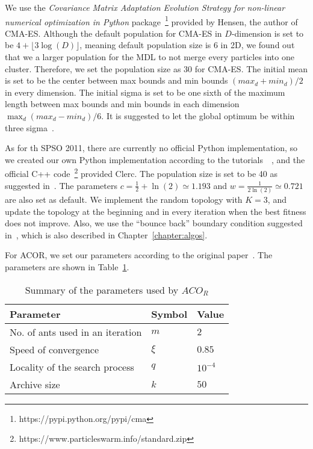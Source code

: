 We use the \textit{Covariance Matrix Adaptation Evolution Strategy for non-linear numerical optimization in Python} package~\footnote{https://pypi.python.org/pypi/cma} provided by Hensen, the author of CMA-ES.
Although the default population for CMA-ES in $D$-dimension is set to be $4 + \lfloor3\log(D)\rfloor$, meaning default population size is 6 in 2D,
we found out that we a larger population for the MDL to not merge every particles into one cluster.
Therefore, we set the population size as 30 for CMA-ES.
The initial mean is set to be the center between max bounds and min bounds $(max_d + min_d)/2$ in every dimension.
The initial sigma is set to be one sixth of the maximum length between max bounds and min bounds in each dimension $\max_{d}(max_d - min_d)/6$.
It is suggested to let the global optimum be within three sigma~\cite{Hansen:2006:CMA_ES_review}.

As for th SPSO 2011, there are currently no official Python implementation, 
so we created our own Python implementation according to the tutorials~\cite{Clerc:2012:SPSO2011}~\cite{Clerc:2007:randomTopology},
and the official C++ code~\footnote{https://www.particleswarm.info/standard\textunderscorepso{}\textunderscorec.zip} provided Clerc.
The population size is set to be 40 as suggested in~\cite{Clerc:2012:SPSO2011}.
The parameters $c = \frac{1}{2} + \ln(2) \simeq 1.193$ and $w = \frac{1}{2\ln(2)} \simeq 0.721$ are also set as default.
We implement the random topology with $K = 3$,
and update the topology at the beginning and in every iteration when the best fitness does not improve.
Also, we use the ``bounce back'' boundary condition suggested in~\cite{Clerc:2012:SPSO2011}, which is also described in Chapter~\ref{chapter:algos}.


For ACOR, we set our parameters according to the original paper~\cite{Socha:2008:ACOR}. 
The parameters are shown in Table~\ref{table:ACOR_parameters}.

\begin{table}%
\centering
\label{table:ACOR_parameters}
\begin{tabular}{lll}
\hline
Parameter                        & Symbol   & Value          \\ \hline
No. of ants used in an iteration & $m$      & $2$            \\
Speed of convergence             & $\xi$    & $0.85$         \\
Locality of the search process   & $q$      & $10^{-4}$      \\
Archive size                     & $k$      & $50$           \\ \hline
\end{tabular}
\caption{Summary of the parameters used by $ACO_R$}
\end{table}

